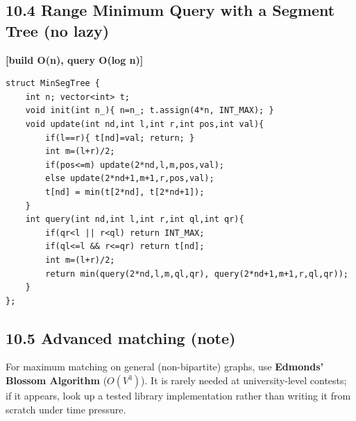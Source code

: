 \documentclass[11pt]{extarticle}
\newcommand{\comp}[1]{\textbf{[#1]}\\}
\begin{document}
\subsection*{10.4 Range Minimum Query with a Segment Tree (no lazy)}
\comp{build O(n), query O(log n)}
\begin{lstlisting}
struct MinSegTree {
    int n; vector<int> t;
    void init(int n_){ n=n_; t.assign(4*n, INT_MAX); }
    void update(int nd,int l,int r,int pos,int val){
        if(l==r){ t[nd]=val; return; }
        int m=(l+r)/2;
        if(pos<=m) update(2*nd,l,m,pos,val);
        else update(2*nd+1,m+1,r,pos,val);
        t[nd] = min(t[2*nd], t[2*nd+1]);
    }
    int query(int nd,int l,int r,int ql,int qr){
        if(qr<l || r<ql) return INT_MAX;
        if(ql<=l && r<=qr) return t[nd];
        int m=(l+r)/2;
        return min(query(2*nd,l,m,ql,qr), query(2*nd+1,m+1,r,ql,qr));
    }
};
\end{lstlisting}

\subsection*{10.5 Advanced matching (note)}
For maximum matching on general (non-bipartite) graphs, use
\textbf{Edmonds' Blossom Algorithm} ($O(V^3)$). It is rarely needed at
university-level contests; if it appears, look up a tested library
implementation rather than writing it from scratch under time
pressure.
\end{document}
